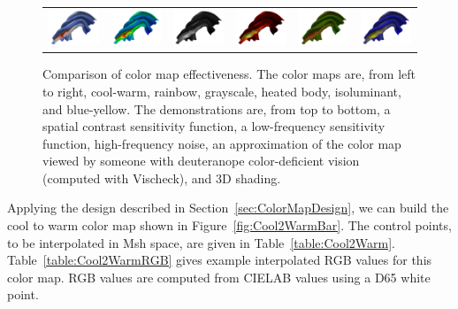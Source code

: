 \documentclass[review,journal]{vgtc}         %
\newcommand{\RGB}{RGB\xspace}
\newcommand{\Lab}{CIELAB\xspace}
\newcommand{\Msh}{Msh\xspace}
\begin{document}
\begin{figure}
\begin{tabular}{c@{\;}c@{\;}c@{\;}c@{\;}c@{\;}c}
    \includegraphics[width=1.1in]{images/Cool2WarmShading} &
    \includegraphics[width=1.1in]{images/RainbowShading} &
    \includegraphics[width=1.1in]{images/GrayscaleShading} &
    \includegraphics[width=1.1in]{images/BlackBodyShading} &
    \includegraphics[width=1.1in]{images/Green2RedShading} &
    \includegraphics[width=1.1in]{images/Blue2YellowShading}
  \end{tabular}
  \caption{Comparison of color map effectiveness.  The color maps are, from
    left to right, cool-warm, rainbow, grayscale, heated body, isoluminant,
    and blue-yellow.  The demonstrations are, from top to bottom, a spatial
    contrast sensitivity function, a low-frequency sensitivity function,
    high-frequency noise, an approximation of the color map viewed by
    someone with deuteranope color-deficient vision (computed with
    Vischeck), and 3D shading.}
  \label{fig:MapComparison}
\end{figure}

Applying the design described in Section~\ref{sec:ColorMapDesign}, we can
build the cool to warm color map shown in Figure~\ref{fig:Cool2WarmBar}.
The control points, to be interpolated in \Msh space, are given in
Table~\ref{table:Cool2Warm}.  Table~\ref{table:Cool2WarmRGB} gives example
interpolated \RGB values for this color map.  \RGB values are computed from
\Lab values using a D65 white point.
\end{document}
